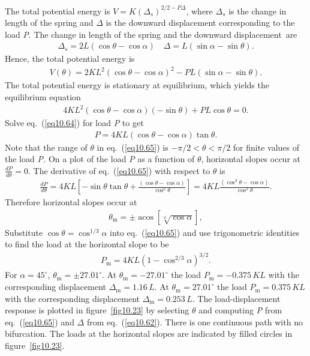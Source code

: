 \documentclass{AeroStructure-ERJohnson}
\begin{document}
The total potential energy is $V=K\left(\Delta_{s}\right)^{2 / 2-P \Delta}$, where $\Delta_{s}$ is the change in length of the spring and $\Delta$ is the downward displacement corresponding to the load \textit{P}. The change in length of the spring and the downward displacement~are\vspace*{-6pt}
\begin{align}\label{eq10.62}
\Delta_{s}=2 L(\cos \theta-\cos \alpha) \quad \Delta=L(\sin \alpha-\sin \theta).
\end{align}
Hence, the total potential energy is
\begin{align}\label{eq10.63}
V(\theta)=2 K L^{2}(\cos \theta-\cos \alpha)^{2}-P L(\sin \alpha-\sin \theta).
\end{align}
The total potential energy is stationary at equilibrium, which yields the equilibrium equation
\begin{align}\label{eq10.64}
4 K L^{2}(\cos \theta-\cos \alpha)(-\sin \theta)+P L \cos \theta=0.
\end{align}
Solve eq.~(\ref{eq10.64}) for load \textit{P} to get
\begin{align}\label{eq10.65}
P=4 K L(\cos \theta-\cos \alpha) \tan \theta.
\end{align}
Note that the range of $\theta$ in eq.~(\ref{eq10.65}) is $-\pi / 2<\theta<\pi / 2$ for finite values of the load \textit{P.} On a plot of the load \textit{P} as a function of $\theta$, horizontal slopes occur at $\frac{d P}{d \theta}=0$. The derivative of eq.~(\ref{eq10.65}) with respect to $\theta$ is
\begin{align}\label{eq10.66}
\frac{d P}{d \theta}=4 K L\left[-\sin \theta \tan \theta+\frac{(\cos \theta-\cos \alpha)}{\cos ^{2} \theta}\right]=4 K L \frac{(\cos ^{3} \theta-\cos \alpha)}{\cos ^{2} \theta}.
\end{align}
Therefore horizontal slopes occur at
\begin{align}\label{eq10.67}
\theta_{\mathrm{m}}=\pm \operatorname{acos}[\sqrt[3]{\cos \alpha}],
\end{align}
Substitute $\cos \theta=\cos ^{1 / 3} \alpha$ into eq.~(\ref{eq10.65}) and use trigonometric identities to find the load at the horizontal slope to be
\begin{align}\label{eq10.68}
P_{\mathrm{m}}=4 K L(1-\cos ^{2 / 3} \alpha)^{3 / 2}.
\end{align}
For $\alpha=45^{\circ}$, $\theta_{\mathrm{m}}=\pm 27.01^{\circ}$. At $\theta_{\mathrm{m}}=-27.01^{\circ}$ the load $P_{\mathrm{m}}=-0.375\,KL$ with the corresponding displacement $\Delta_{\mathrm{m}}=1.16\,{L}$. At $\theta_{\mathrm{m}}=27.01^{\circ}$ the load $P_{\mathrm{m}}=0.375\,{KL}$ with the corresponding displacement $\Delta_{\mathrm{m}}=0.253\,{L}$. The load-displacement response is plotted in figure~\ref{fig10.23} by selecting $\theta$ and computing \textit{P} from eq.~(\ref{eq10.65}) and $\Delta$ from eq.~(\ref{eq10.62}). There is one continuous path with no bifurcation. The loads at the horizontal slopes are indicated by filled circles in figure~\ref{fig10.23}.
\end{document}
